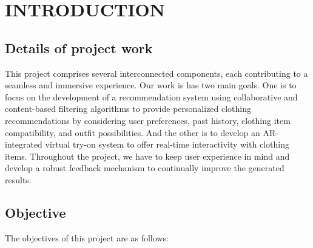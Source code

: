 \chapter{INTRODUCTION}

\section{Details of project work}
	This project comprises several interconnected components, each contributing to a seamless and immersive experience. Our work is has two main goals. One is to focus on the development of a recommendation system using collaborative and content-based filtering algorithms to provide personalized clothing recommendations by considering user preferences, past history, clothing item compatibility, and outfit possibilities. And the other is to develop an AR-integrated virtual try-on system to offer real-time interactivity with clothing items. Throughout the project, we have to keep user experience in mind and develop a robust feedback mechanism to continually improve the generated results.

\section{Objective}
	The objectives of this project are as follows:


